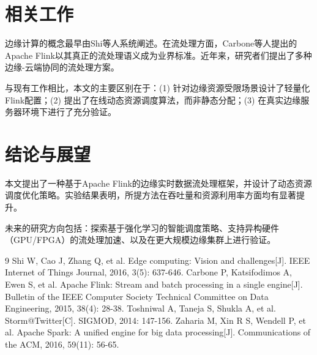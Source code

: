 \documentclass[twocolumn]{harryopo-paper}
\begin{document}
\section{相关工作}

边缘计算的概念最早由Shi等人\cite{edge}系统阐述。在流处理方面，Carbone等人\cite{flink}提出的Apache Flink以其真正的流处理语义成为业界标准。近年来，研究者们提出了多种边缘-云端协同的流处理方案。

与现有工作相比，本文的主要区别在于：(1) 针对边缘资源受限场景设计了轻量化Flink配置；(2) 提出了在线动态资源调度算法，而非静态分配；(3) 在真实边缘服务器环境下进行了充分验证。

\section{结论与展望}

本文提出了一种基于Apache Flink的边缘实时数据流处理框架，并设计了动态资源调度优化策略。实验结果表明，所提方法在吞吐量和资源利用率方面均有显著提升。

未来的研究方向包括：探索基于强化学习的智能调度策略、支持异构硬件（GPU/FPGA）的流处理加速、以及在更大规模边缘集群上进行验证。

\begin{thebibliography}{9}
 Shi W, Cao J, Zhang Q, et al. Edge computing: Vision and challenges[J]. IEEE Internet of Things Journal, 2016, 3(5): 637-646.
 Carbone P, Katsifodimos A, Ewen S, et al. Apache Flink: Stream and batch processing in a single engine[J]. Bulletin of the IEEE Computer Society Technical Committee on Data Engineering, 2015, 38(4): 28-38.
 Toshniwal A, Taneja S, Shukla A, et al. Storm@Twitter[C]. SIGMOD, 2014: 147-156.
 Zaharia M, Xin R S, Wendell P, et al. Apache Spark: A unified engine for big data processing[J]. Communications of the ACM, 2016, 59(11): 56-65.
\end{thebibliography}
\end{document}
